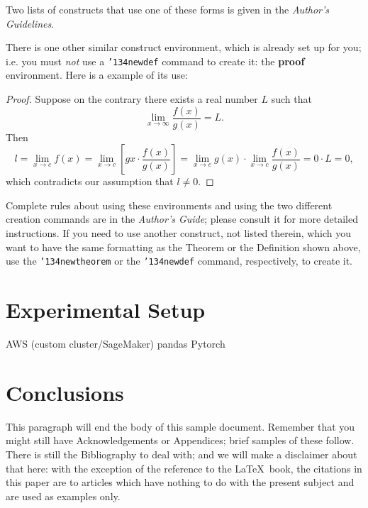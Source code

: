 \documentclass{sigkddExp}
\begin{document}
Two lists of constructs that use one of these
forms is given in the
\textit{Author's  Guidelines}.
 
There is one other similar construct environment, which is
already set up
for you; i.e. you must \textit{not} use
a \texttt{{\char'134}newdef} command to
create it: the \textbf{proof} environment.  Here
is a example of its use:
\begin{proof}
Suppose on the contrary there exists a real number $L$ such that
\begin{displaymath}
\lim_{x\rightarrow\infty} \frac{f(x)}{g(x)} = L.
\end{displaymath}
Then
\begin{displaymath}
l=\lim_{x\rightarrow c} f(x)
= \lim_{x\rightarrow c}
\left[ g{x} \cdot \frac{f(x)}{g(x)} \right ]
= \lim_{x\rightarrow c} g(x) \cdot \lim_{x\rightarrow c}
\frac{f(x)}{g(x)} = 0\cdot L = 0,
\end{displaymath}
which contradicts our assumption that $l\neq 0$.
\end{proof}

Complete rules about using these environments and using the
two different creation commands are in the
\textit{Author's Guide}; please consult it for more
detailed instructions.  If you need to use another construct,
not listed therein, which you want to have the same
formatting as the Theorem
or the Definition\cite{salas:calculus} shown above,
use the \texttt{{\char'134}newtheorem} or the
\texttt{{\char'134}newdef} command,
respectively, to create it.

\section{Experimental Setup}
AWS (custom cluster/SageMaker)
pandas 
Pytorch


\section{Conclusions}
This paragraph will end the body of this sample document.
Remember that you might still have Acknowledgements or
Appendices; brief samples of these
follow.  There is still the Bibliography to deal with; and
we will make a disclaimer about that here: with the exception
of the reference to the \LaTeX\ book, the citations in
this paper are to articles which have nothing to
do with the present subject and are used as
examples only.
\end{document}
